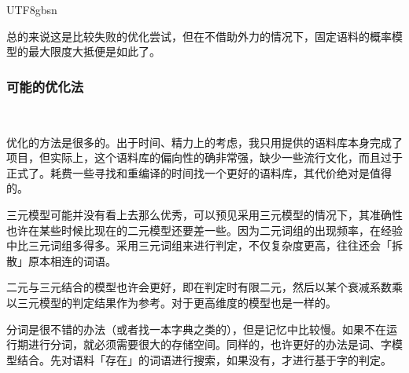 \documentclass{article}
\newenvironment{tmindent}{\begin{tmparmod}{1.5em}{0pt}{0pt}}{\end{tmparmod}}
\newenvironment{tmparmod}[3]{\begin{list}{}{\setlength{\topsep}{0pt}\setlength{\leftmargin}{#1}\setlength{\rightmargin}{#2}\setlength{\parindent}{#3}\setlength{\listparindent}{\parindent}\setlength{\itemindent}{\parindent}\setlength{\parsep}{\parskip}} \item[]}{\end{list}}
\begin{document}
\begin{CJK*}{UTF8}{gbsn}
\begin{tmindent}
  总的来说这是比较失败的优化尝试，但在不借助外力的情况下，固定语料的概率模型的最大限度大抵便是如此了。
\end{tmindent}

\subsubsection{可能的优化法}

\begin{tmindent}
  \
  
  优化的方法是很多的。出于时间、精力上的考虑，我只用提供的语料库本身完成了项目，但实际上，这个语料库的偏向性的确非常强，缺少一些流行文化，而且过于正式了。耗费一些寻找和重编译的时间找一个更好的语料库，其代价绝对是值得的。
  
  三元模型可能并没有看上去那么优秀，可以预见采用三元模型的情况下，其准确性也许在某些时候比现在的二元模型还要差一些。因为二元词组的出现频率，在经验中比三元词组多得多。采用三元词组来进行判定，不仅复杂度更高，往往还会「拆散」原本相连的词语。
  
  二元与三元结合的模型也许会更好，即在判定时有限二元，然后以某个衰减系数乘以三元模型的判定结果作为参考。对于更高维度的模型也是一样的。
  
  分词是很不错的办法（或者找一本字典之类的），但是记忆中比较慢。如果不在运行期进行分词，就必须需要很大的存储空间。同样的，也许更好的办法是词、字模型结合。先对语料「存在」的词语进行搜索，如果没有，才进行基于字的判定。{}
\end{tmindent}

\end{CJK*}
\end{document}
